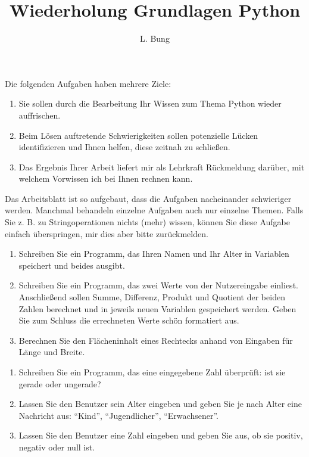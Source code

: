 \documentclass[11pt, a4paper, oneside]{article}
\begin{document}
	\author{L. Bung}
	\title{Wiederholung \hspace{5cm} Grundlagen Python}
	\subject{SAE}
	\maketitle
	
	Die folgenden Aufgaben haben mehrere Ziele:
	
	\begin{enumerate}
		\item Sie sollen durch die Bearbeitung Ihr Wissen zum Thema Python wieder auffrischen.
		\item Beim Lösen auftretende Schwierigkeiten sollen potenzielle Lücken identifizieren und Ihnen helfen, diese zeitnah zu schließen.
		\item Das Ergebnis Ihrer Arbeit liefert mir als Lehrkraft Rückmeldung darüber, mit welchem Vorwissen ich bei Ihnen rechnen kann.
	\end{enumerate}
	
	Das Arbeitsblatt ist so aufgebaut, dass die Aufgaben nacheinander schwieriger werden.
	Manchmal behandeln einzelne Aufgaben auch nur einzelne Themen.
	Falls Sie z. B. zu Stringoperationen nichts (mehr) wissen, können Sie diese Aufgabe einfach überspringen, mir dies aber bitte zurückmelden.
	
	
	\begin{enumerate}[label=\alph*)]
		\item Schreiben Sie ein Programm, das Ihren Namen und Ihr Alter in Variablen speichert und beides ausgibt.
		\item Schreiben Sie ein Programm, das zwei Werte von der Nutzereingabe einliest.
		Anschließend sollen Summe, Differenz, Produkt und Quotient der beiden Zahlen berechnet und in jeweils neuen Variablen gespeichert werden.
		Geben Sie zum Schluss die errechneten Werte schön formatiert aus.
		\item Berechnen Sie den Flächeninhalt eines Rechtecks anhand von Eingaben für Länge und Breite.
	\end{enumerate}
	
	
	\begin{enumerate}[label=\alph*)]
		\item Schreiben Sie ein Programm, das eine eingegebene Zahl überprüft: ist sie gerade oder ungerade?
		\item Lassen Sie den Benutzer sein Alter eingeben und geben Sie je nach Alter eine Nachricht aus: ``Kind'', ``Jugendlicher'', ``Erwachsener''.
		\item Lassen Sie den Benutzer eine Zahl eingeben und geben Sie aus, ob sie positiv, negativ oder null ist.
	\end{enumerate}
	
\end{document}
